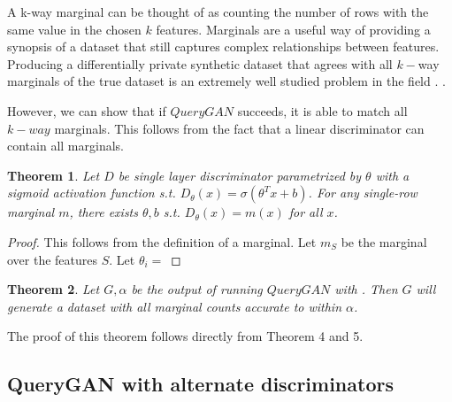 \documentclass[]{article}
\newtheorem{theorem}{Theorem}
\begin{document}
A k-way marginal can be thought of as counting the number of rows with the same value in the chosen $k$ features. Marginals are a useful way of providing a synopsis of a dataset that still captures complex relationships between features. Producing a differentially private synthetic dataset that agrees with all $k-$way marginals of the true dataset is an extremely well studied problem in the field . .

However, we can show that if $QueryGAN$ succeeds, it is able to match all $k-way$ marginals. This follows from the fact that a linear discriminator can contain all marginals.

\begin{theorem}
    Let $D$ be single layer discriminator parametrized by $\theta$ with a sigmoid activation function s.t. $D_\theta(x) = \sigma(\theta^Tx + b)$. For any single-row marginal $m$, there exists $\theta, b$ s.t. $D_\theta(x) = m(x)$ for all $x$.  
\end{theorem}

\begin{proof}
    This follows from the definition of a marginal. Let $m_S$ be the marginal over the features $S$. Let $\theta_i = $ 
\end{proof}

\begin{theorem}
    Let $G, \alpha$ be the output of running $QueryGAN$ with . Then $G$ will generate a dataset with all marginal counts accurate to within $\alpha$.
\end{theorem}


The proof of this theorem follows directly from Theorem 4 and 5. 





\subsection{QueryGAN with alternate discriminators}
\end{document}
